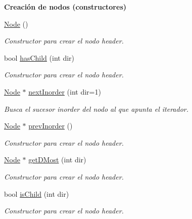\begin{Indent}{\bf Creación de nodos (constructores)}\par
\begin{DoxyCompactItemize}
\item 
\hyperlink{structaed2_1_1map_1_1Node_a9c1a600491066ce7eb669b1cb76d56c6_a9c1a600491066ce7eb669b1cb76d56c6}{Node} ()
\begin{DoxyCompactList}\small\item\em Constructor para crear el nodo header. \end{DoxyCompactList}\item 
bool \hyperlink{structaed2_1_1map_1_1Node_a7156a65bc1ffc8fd6c8548e437bc2e43_a7156a65bc1ffc8fd6c8548e437bc2e43}{has\-Child} (int dir)
\begin{DoxyCompactList}\small\item\em Constructor para crear el nodo header. \end{DoxyCompactList}\item 
\hyperlink{structaed2_1_1map_1_1Node}{Node} $\ast$ \hyperlink{structaed2_1_1map_1_1Node_a6b8023794e29d91caa7fc48ecf548877_a6b8023794e29d91caa7fc48ecf548877}{next\-Inorder} (int dir=1)
\begin{DoxyCompactList}\small\item\em Busca el sucesor inorder del nodo al que apunta el iterador. \end{DoxyCompactList}\item 
\hyperlink{structaed2_1_1map_1_1Node}{Node} $\ast$ \hyperlink{structaed2_1_1map_1_1Node_ace5f2727ac92ec79323155a3f0f761fb_ace5f2727ac92ec79323155a3f0f761fb}{prev\-Inorder} ()
\begin{DoxyCompactList}\small\item\em Constructor para crear el nodo header. \end{DoxyCompactList}\item 
\hyperlink{structaed2_1_1map_1_1Node}{Node} $\ast$ \hyperlink{structaed2_1_1map_1_1Node_afc97d72bfcc58f0dbe8f2d5b03950dc8_afc97d72bfcc58f0dbe8f2d5b03950dc8}{get\-D\-Most} (int dir)
\begin{DoxyCompactList}\small\item\em Constructor para crear el nodo header. \end{DoxyCompactList}\item 
bool \hyperlink{structaed2_1_1map_1_1Node_a955064010744e4e9964a48f8889675ae_a955064010744e4e9964a48f8889675ae}{is\-Child} (int dir)
\begin{DoxyCompactList}\small\item\em Constructor para crear el nodo header. \end{DoxyCompactList}\item 

\end{DoxyCompactItemize}
\end{Indent}
